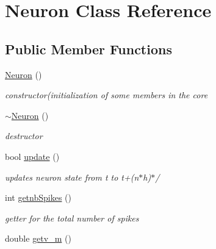 \hypertarget{classNeuron}{\section{Neuron Class Reference}
\label{classNeuron}
}
\subsection*{Public Member Functions}
\begin{DoxyCompactItemize}
\item 
\hypertarget{classNeuron_a823487d01615fadb8ac19a2768dd9d96}{\hyperlink{classNeuron_a823487d01615fadb8ac19a2768dd9d96}{Neuron} ()}\label{classNeuron_a823487d01615fadb8ac19a2768dd9d96}

\begin{DoxyCompactList}\small\item\em constructor(initialization of some members in the core \end{DoxyCompactList}\item 
\hypertarget{classNeuron_a94a250ce7e167760e593979b899745b1}{\hyperlink{classNeuron_a94a250ce7e167760e593979b899745b1}{$\sim$\-Neuron} ()}\label{classNeuron_a94a250ce7e167760e593979b899745b1}

\begin{DoxyCompactList}\small\item\em destructor \end{DoxyCompactList}\item 
\hypertarget{classNeuron_ade349102c17d508352a1061798083ba2}{bool \hyperlink{classNeuron_ade349102c17d508352a1061798083ba2}{update} ()}\label{classNeuron_ade349102c17d508352a1061798083ba2}

\begin{DoxyCompactList}\small\item\em updates neuron state from t to t+(n$\ast$h)$\ast$/ \end{DoxyCompactList}\item 
\hypertarget{classNeuron_affb0899ac310398da71c5d3fdb1777a5}{int \hyperlink{classNeuron_affb0899ac310398da71c5d3fdb1777a5}{getnb\-Spikes} ()}\label{classNeuron_affb0899ac310398da71c5d3fdb1777a5}

\begin{DoxyCompactList}\small\item\em getter for the total number of spikes \end{DoxyCompactList}\item 
\hypertarget{classNeuron_a4a10380b3515e38a1a4baae7b4ab66ce}{double \hyperlink{classNeuron_a4a10380b3515e38a1a4baae7b4ab66ce}{getv\-\_\-m} ()}\label{classNeuron_a4a10380b3515e38a1a4baae7b4ab66ce}


\end{DoxyCompactItemize}
